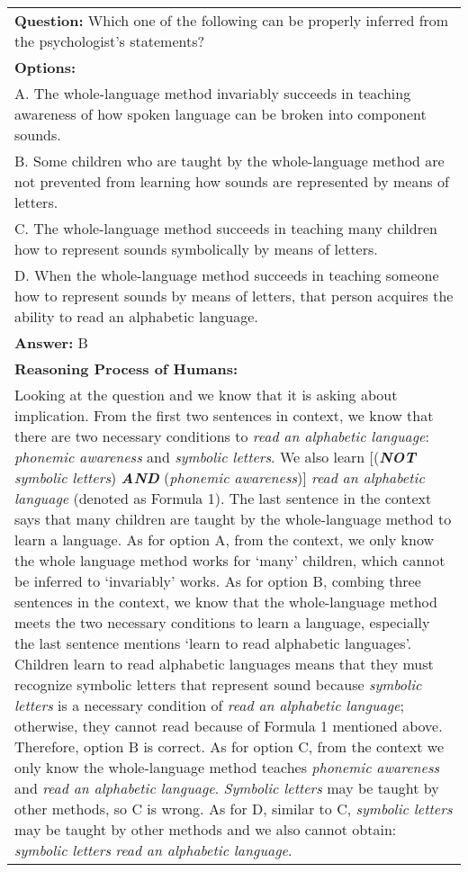 \documentclass{article} \usepackage{iclr2020_conference,times}
\begin{document}
\begin{table}
\begin{tabular}{|p{\columnwidth}|}
        \textbf{Question: }
        Which one of the following can be properly inferred from the psychologist's statements?\\
        \textbf{Options: } \\
        A. The whole-language method invariably succeeds in teaching awareness of how spoken language can be broken into component sounds.\\
        B. Some children who are taught by the whole-language method are not prevented from learning how sounds are represented by means of letters.\\
        C. The whole-language method succeeds in teaching many children how to represent sounds symbolically by means of letters.\\
        D. When the whole-language method succeeds in teaching someone how to represent sounds by means of letters, that person acquires the ability to read an alphabetic language.\\
        \textbf{Answer: }B\\
        \textbf{Reasoning Process of Humans: }\\
        Looking at the question and we know that it is asking about implication. From the first two sentences in context, we know that there are two necessary conditions to \textit{read an alphabetic language}: \textit{phonemic awareness} and \textit{symbolic letters}. We also learn [(\textit{\textbf{NOT} symbolic letters}) \textit{\textbf{AND}} (\textit{phonemic awareness})]  \textit{read an alphabetic language} (denoted as Formula 1). The last sentence in the context says that many children are taught by the whole-language method to learn a language. As for option A, from the context, we only know the whole language method works for `many' children, which cannot be inferred to `invariably' works. As for option B, combing three sentences in the context, we know that the whole-language method meets the two necessary conditions to learn a language, especially the last sentence mentions `learn to read alphabetic languages'. Children learn to read alphabetic languages means that they must recognize symbolic letters that represent sound because \textit{symbolic letters} is a necessary condition of \textit{read an alphabetic language}; otherwise, they cannot read because of Formula 1 mentioned above. Therefore, option B is correct. As for option C, from the context we only know the whole-language method teaches \textit{phonemic awareness} and \textit{read an alphabetic language}. \textit{Symbolic letters} may be taught by other methods, so C is wrong. As for D, similar to C, \textit{symbolic letters} may be taught by other methods and we also cannot obtain: \textit{symbolic letters}  \textit{read an alphabetic language}. 
        \\
		\hline		
	\end{tabular}
	\label{tab:example_to_solve}
\end{table}
\end{document}
